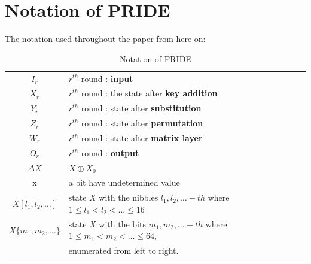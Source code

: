 \documentclass{transcrypto}
\begin{document}
	\section{Notation of PRIDE}
	The notation used throughout the paper from here on:
	\begin{table}[H]
		\centering
		\begin{tabular}{cl}
			
			$ I_r $ & $ r^{th} $ round : \textbf{input}\\ 
			$ X_r $ & $ r^{th} $ round : the state after \textbf{key addition}\\ 
			$ Y_r $ & $ r^{th} $ round : state after \textbf{substitution}\\
			$ Z_r $ & $ r^{th} $ round : state after \textbf{permutation}\\ 
			$ W_r $ & $ r^{th} $ round : state after \textbf{matrix layer}\\ 
			$ O_r $ & $ r^{th} $ round : \textbf{output}\\ 
			$ \Delta X $ & $ X \oplus X_0 $ \\ 
			x & a bit have undetermined value\\ 
			$ X[l_1 , l_2, \dots] $ & state $ X $ with the nibbles $ l_1, l_2, \dots-th $ where $ 1\le l_1 < l_2 < . . . \le 16 $ \\ 
			$ X\{m_1 , m_2, \dots\} $ & state $ X $ with the bits $ m_1, m_2, \dots-th $ where $ 1 \le m_1 < m_2 < \dots \le 64 $,\\
			&enumerated from left to right.\\ 
		\end{tabular}
		\caption{Notation of PRIDE}
		\label{n}
	\end{table}
\end{document}
